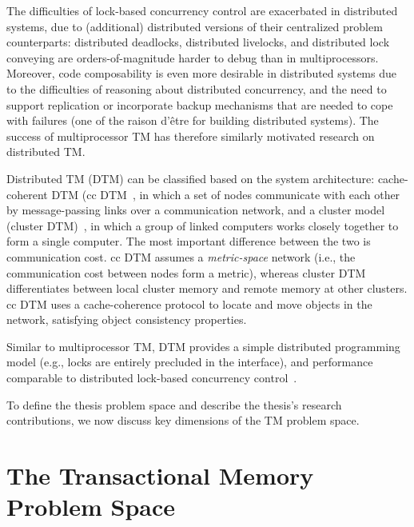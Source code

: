 \documentclass[12pt,english]{report}
\begin{document}
The difficulties of lock-based concurrency control are exacerbated in distributed systems, due to (additional) distributed versions of their centralized problem counterparts: distributed deadlocks, distributed livelocks, and distributed lock conveying are orders-of-magnitude harder to debug than in multiprocessors. Moreover, code composability is even more desirable in distributed systems due to the difficulties of reasoning about distributed concurrency, and the need to support replication or incorporate backup mechanisms that are needed to cope with failures (one of the raison d'\^etre for building distributed systems). The success of multiprocessor TM has therefore similarly motivated research on  distributed TM. 

Distributed TM (DTM) can be classified based on the system architecture: cache-coherent DTM (cc DTM~\cite{HerlihyS07,zha09,zha093,zha092,Saad:2011:HHP:1996130.1996167,
kr-sss10,hyflow-transact11,snake,ntfa-11},  in which a set of nodes communicate with each other by message-passing links over a communication network, and a cluster model (cluster DTM)~\cite{boc08,manassiev:cluster-tm:2006,kot08,couceiro:d2stm:prdc:2009,romano:distribute-tm-clusters:lncs:2009,romano:cloud-tm:sigops-review:2010}, in which a group of linked computers works closely together to form a single computer. The most important difference between the two is communication cost. cc DTM assumes a \textit{metric-space} network (i.e., the communication cost 
between nodes form a metric), whereas cluster DTM differentiates between local cluster memory and remote memory at other clusters. 
cc DTM uses a cache-coherence protocol to locate and move objects in the network, satisfying object consistency properties. 

Similar to multiprocessor TM, DTM provides a simple distributed programming model (e.g., locks are entirely precluded in the interface), and performance comparable to distributed lock-based concurrency control~\cite{couceiro:d2stm:prdc:2009,kr-sss10,boc08,romano:distribute-tm-clusters:lncs:2009,romano:cloud-tm:sigops-review:2010,manassiev:cluster-tm:2006,zha09,zha092,zha093,Saad:2011:HHP:1996130.1996167,kr-sss10,hyflow-transact11,snake}. 

To define the thesis problem space and describe the thesis's research contributions, we now discuss key dimensions of the TM problem space. 

\section{The Transactional Memory Problem Space}
\end{document}
